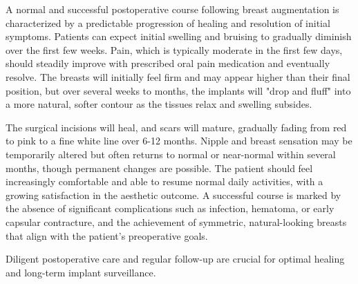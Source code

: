 A normal and successful postoperative course following breast augmentation is characterized by a predictable progression of healing and resolution of initial symptoms. Patients can expect initial swelling and bruising to gradually diminish over the first few weeks. Pain, which is typically moderate in the first few days, should steadily improve with prescribed oral pain medication and eventually resolve. The breasts will initially feel firm and may appear higher than their final position, but over several weeks to months, the implants will "drop and fluff" into a more natural, softer contour as the tissues relax and swelling subsides.

The surgical incisions will heal, and scars will mature, gradually fading from red to pink to a fine white line over 6-12 months. Nipple and breast sensation may be temporarily altered but often returns to normal or near-normal within several months, though permanent changes are possible. The patient should feel increasingly comfortable and able to resume normal daily activities, with a growing satisfaction in the aesthetic outcome. A successful course is marked by the absence of significant complications such as infection, hematoma, or early capsular contracture, and the achievement of symmetric, natural-looking breasts that align with the patient's preoperative goals.

Diligent postoperative care and regular follow-up are crucial for optimal healing and long-term implant surveillance.

